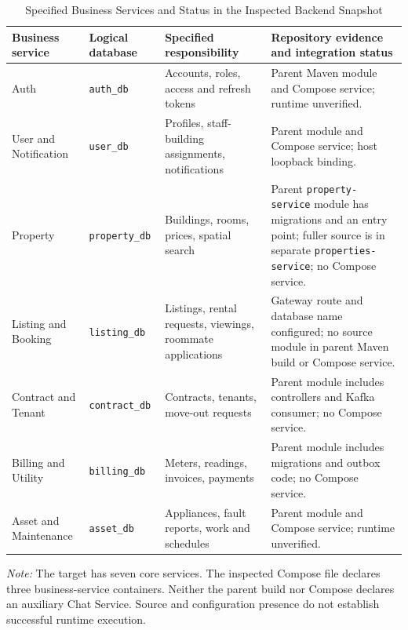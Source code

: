 \begin{table}[t]
\caption{Specified Business Services and Status in the Inspected Backend Snapshot}
\label{tab:services}
\centering\footnotesize
\begin{tabularx}{\textwidth}{@{}p{}p{}X X@{}}
\toprule
Business service & Logical database & Specified responsibility & Repository evidence and integration status \\
\midrule
Auth & \texttt{auth\_db} & Accounts, roles, access and refresh tokens & Parent Maven module and Compose service; runtime unverified. \\
User and Notification & \texttt{user\_db} & Profiles, staff-building assignments, notifications & Parent module and Compose service; host loopback binding. \\
Property & \texttt{property\_db} & Buildings, rooms, prices, spatial search & Parent \texttt{property-service} module has migrations and an entry point; fuller source is in separate \texttt{properties-service}; no Compose service. \\
Listing and Booking & \texttt{listing\_db} & Listings, rental requests, viewings, roommate applications & Gateway route and database name configured; no source module in parent Maven build or Compose service. \\
Contract and Tenant & \texttt{contract\_db} & Contracts, tenants, move-out requests & Parent module includes controllers and Kafka consumer; no Compose service. \\
Billing and Utility & \texttt{billing\_db} & Meters, readings, invoices, payments & Parent module includes migrations and outbox code; no Compose service. \\
Asset and Maintenance & \texttt{asset\_db} & Appliances, fault reports, work and schedules & Parent module and Compose service; runtime unverified. \\
\bottomrule
\end{tabularx}
\smallskip\par\raggedright\textit{Note:} The target has seven core services. The inspected Compose file declares three business-service containers. Neither the parent build nor Compose declares an auxiliary Chat Service. Source and configuration presence do not establish successful runtime execution.
\end{table}
